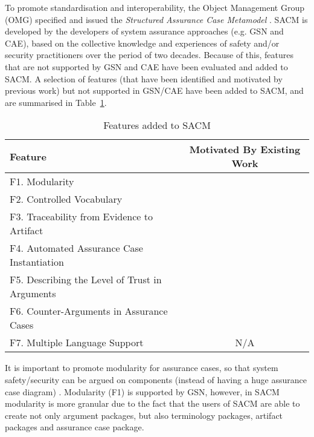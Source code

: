 To promote standardisation and interoperability, the Object Management Group (OMG) specified and issued the \textit{Structured Assurance Case Metamodel} \cite{sacm}. 
SACM is developed by the developers of system assurance approaches (e.g. GSN and CAE), based on the collective knowledge and experiences of safety and/or security practitioners over the period of two decades. 
Because of this, features that are not supported by GSN and CAE have been evaluated and added to SACM. 
A selection of features (that have been identified and motivated by previous work) but not supported in GSN/CAE have been added to SACM, and are summarised in Table~\ref{tab:feature}.

\begin{table}[]
	\centering
	\begin{tabular}{|l|l|}
		\hline
		\textbf{Feature}               & \multicolumn{1}{c|}{\textbf{Motivated By Existing Work}}                        \\ \hline
		F1. Modularity            & \multicolumn{1}{c|}{\cite{despotou2008investigating}} \\ \hline
		F2. Controlled Vocabulary &\multicolumn{1}{c|}{\cite{luo2015safety, attwood2014use}}                  \\ \hline
		F3. Traceability from Evidence to Artifact &\multicolumn{1}{c|}{\cite{taguchi2014linking}}                  \\ \hline
		F4. Automated Assurance Case Instantiation &\multicolumn{1}{c|}{\cite{hawkins2015need}}                  \\ \hline
		F5. Describing the Level of Trust in Arguments &\multicolumn{1}{c|}{\cite{fenn2005putting}}                  \\ \hline
		F6. Counter-Arguments in Assurance Cases &\multicolumn{1}{c|}{\cite{armstrong2004deconstruction}}                  \\ \hline
		F7. Multiple Language Support &\multicolumn{1}{c|}{N/A}                  \\ \hline
	\end{tabular}
	\caption{Features added to SACM}
	\label{tab:feature}
\end{table}

It is important to promote modularity for assurance cases, so that system safety/security can be argued on components (instead of having a huge assurance case diagram) \cite{despotou2008investigating}. 
Modularity (F1) is supported by GSN, however, in SACM modularity is more granular due to the fact that the users of SACM are able to create not only argument packages, but also terminology packages, artifact packages and assurance case package.

